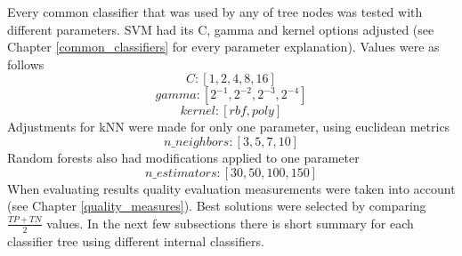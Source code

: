 Every common classifier that was used by any of tree nodes was tested with different parameters. SVM had its C, gamma and kernel options adjusted (see Chapter \ref{common_classifiers} for every parameter explanation). Values were as follows \[ C: [ 1, 2, 4, 8, 16 ] \] \[ gamma: [ 2^{-1}, 2^{-2}, 2^{-3}, 2^{-4} ] \]  \[ kernel: [ rbf, poly ] \] 
Adjustments for kNN were made for only one parameter, using euclidean metrics \[ n\_neighbors: [ 3, 5, 7, 10 ] \]
Random forests also had modifications applied to one parameter \[ n\_estimators: [ 30, 50, 100, 150 ] \]
When evaluating results quality evaluation measurements were taken into account (see Chapter \ref{quality_measures}). Best solutions were selected by comparing $ \frac{TP + TN}{2} $ values. In the next few subsections there is short summary for each classifier tree using different internal classifiers.


